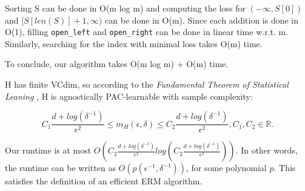 \documentclass{article}
\newcommand{\<}{\langle}
\renewcommand{\>}{\rangle}
\theoremstyle{definition}
\begin{document}
Sorting S can be done in O(m log m) and computing the loss for $(-\infty, S[0])$ and $[S[len(S)] + 1, \infty)$ can be done in O(m). Since each addition is done in O(1), filling \texttt{open\_left} and \texttt{open\_right} can be done in linear time w.r.t. m. Similarly, searching for the index with minimal loss takes O(m) time. 

To conclude, our algorithm takes O(m log m) + O(m) time. 

H has finite VCdim, so according to the \textit{Fundamental Theorem of Statistical Leaning} \cite{SS}, H is agnostically PAC-learnable with sample complexity:

$$C_1\frac{d+ log(\delta^{-1})}{\epsilon^2} \leq m_H(\epsilon, \delta) \leq C_2 \frac{d+log(\delta^{-1})}{\epsilon^2}, C_1, C_2 \in \mathbb{R}.$$

Our runtime is at most $O(C_2 \frac{d+log(\delta^{-1})}{\epsilon^2} log(C_2 \frac{d+log(\delta^{-1})}{\epsilon^2}))$. In other words, the runtime can be written as $O(p(\epsilon^{-1}, \delta^{-1}))$, for some polynomial $p$. This satisfies the definition of an efficient ERM algorithm.

\newpage

\printbibliography
\end{document}
